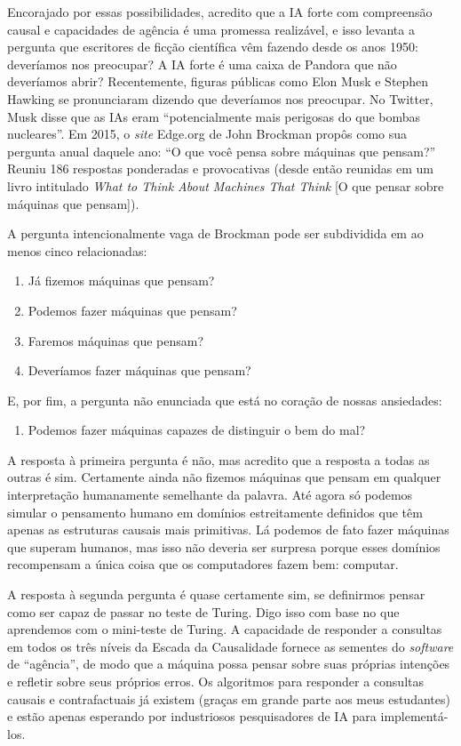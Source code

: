 \documentclass[11pt,a5paper,twoside]{book}
\begin{document}
Encorajado por essas possibilidades, acredito que a IA forte com compreensão causal e capacidades de agência é uma promessa realizável, e isso levanta a pergunta que escritores de ficção científica vêm fazendo desde os anos 1950: deveríamos nos preocupar? A IA forte é uma caixa de Pandora que não deveríamos abrir? Recentemente, figuras públicas como Elon Musk e Stephen Hawking se pronunciaram dizendo que deveríamos nos preocupar. No Twitter, Musk disse que as IAs eram “potencialmente mais perigosas do que bombas nucleares”. Em 2015, o \textit{site} Edge.org de John Brockman propôs como sua pergunta anual daquele ano: “O que você pensa sobre máquinas que pensam?” Reuniu 186 respostas ponderadas e provocativas (desde então reunidas em um livro intitulado \textit{What to Think About Machines That Think} [O que pensar sobre máquinas que pensam]).

A pergunta intencionalmente vaga de Brockman pode ser subdividida em ao menos cinco relacionadas:

\begin{enumerate}
\item Já fizemos máquinas que pensam?
\item Podemos fazer máquinas que pensam?
\item Faremos máquinas que pensam?
\item Deveríamos fazer máquinas que pensam?
\end{enumerate}
E, por fim, a pergunta não enunciada que está no coração de nossas ansiedades:

\begin{enumerate}
\item Podemos fazer máquinas capazes de distinguir o bem do mal?
\end{enumerate}
A resposta à primeira pergunta é não, mas acredito que a resposta a todas as outras é sim. Certamente ainda não fizemos máquinas que pensam em qualquer interpretação humanamente semelhante da palavra. Até agora só podemos simular o pensamento humano em domínios estreitamente definidos que têm apenas as estruturas causais mais primitivas. Lá podemos de fato fazer máquinas que superam humanos, mas isso não deveria ser surpresa porque esses domínios recompensam a única coisa que os computadores fazem bem: computar.

A resposta à segunda pergunta é quase certamente sim, se definirmos pensar como ser capaz de passar no teste de Turing. Digo isso com base no que aprendemos com o mini-teste de Turing. A capacidade de responder a consultas em todos os três níveis da Escada da Causalidade fornece as sementes do \textit{software} de “agência”, de modo que a máquina possa pensar sobre suas próprias intenções e refletir sobre seus próprios erros. Os algoritmos para responder a consultas causais e contrafactuais já existem (graças em grande parte aos meus estudantes) e estão apenas esperando por industriosos pesquisadores de IA para implementá-los.
\end{document}
